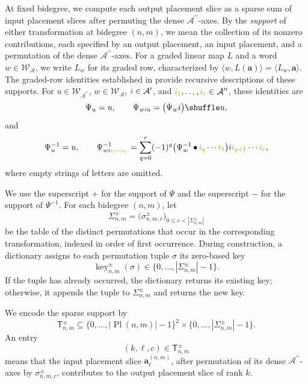 \documentclass{amsart}
\theoremstyle{definition}
\theoremstyle{remark}
\newcommand{\gammashuffle}{{\,\bullet\,}}
\newcommand{\blue}[1]{{\color{blue}#1}}
\newcommand{\orange}[1]{{\color{orange}#1}}
\begin{document}
At fixed bidegree, we compute each output placement slice as a sparse sum
of input placement slices after permuting the dense
$\mathcal{A}^{\prime\prime}$-axes. By the \emph{support} of either
transformation at bidegree $(n,m)$, we mean the collection of its nonzero
contributions, each specified by an output placement, an input placement,
and a permutation of the dense
$\mathcal{A}^{\prime\prime}$-axes. For a graded linear map $L$ and a word
$w\in\mathcal{W}_{\mathcal{A}}$, we write $L_w$ for its graded row,
characterized by
$\langle w,L(\mathbf{a})\rangle=\langle L_w,\mathbf{a}\rangle$.
The graded-row identities established in
\cite[Propositions~3.2 and~3.7]{mainpaper} provide recursive descriptions
of these supports. For
$u\in\mathcal{W}_{\mathcal{A}^{\prime\prime}}$,
$w\in\mathcal{W}_{\mathcal{A}}$,
$\blue{i}\in\mathcal{A}^{\prime}$, and
$\orange{i_1},\ldots,\orange{i_r}
\in\mathcal{A}^{\prime\prime}$, these identities are
\begin{equation}
\label{eq:psi_row_recursion}
    \Psi_u
    =
    u,
    \qquad
    \Psi_{w\blue{i}u}
    =
    \bigl(
        \Psi_w\blue{i}
    \bigr)
    \shuffle u,
\end{equation}
and
\begin{equation}
\label{eq:psi_inverse_row_recursion}
    \Psi^{-1}_u
    =
    u,
    \qquad
    \Psi^{-1}_{w\blue{i}\orange{i_1}\cdots\orange{i_r}}
    =
    \sum_{q=0}^{r}
    (-1)^q
    \bigl(
        \Psi^{-1}_w
        \gammashuffle
        \orange{i_q}\cdots\orange{i_1}
    \bigr)
    \blue{i}
    \orange{i_{q+1}}\cdots\orange{i_r},
\end{equation}
where empty strings of letters are omitted.

We use the superscript $+$ for the support of $\Psi$ and the superscript
$-$ for the support of $\Psi^{-1}$. For each bidegree $(n,m)$, let
\[
    \Sigma^{\pm}_{n,m}
    =
    \bigl(
        \sigma^{\pm}_{n,m,c}
    \bigr)_{0\leq c<|\Sigma^{\pm}_{n,m}|}
\]
be the table of the distinct permutations that occur in the corresponding
transformation, indexed in order of first occurrence. During construction,
a dictionary assigns to each permutation tuple $\sigma$ its zero-based key
\[
    \operatorname{key}^{\pm}_{n,m}(\sigma)
    \in
    \{0,\ldots,|\Sigma^{\pm}_{n,m}|-1\}.
\]
If the tuple has already occurred, the dictionary returns its existing key;
otherwise, it appends the tuple to $\Sigma^{\pm}_{n,m}$ and returns the new
key.

We encode the sparse support by
\[
    \mathsf{T}^{\pm}_{n,m}
    \subseteq
    \{0,\ldots,|\operatorname{Pl}(n,m)|-1\}^{2}
    \times
    \{0,\ldots,|\Sigma^{\pm}_{n,m}|-1\}.
\]
An entry
\[
    (k,\ell,c)
    \in
    \mathsf{T}^{\pm}_{n,m}
\]
means that the input placement slice
$\mathbf{a}^{(n,m)}_\ell$, after permutation of its dense
$\mathcal{A}^{\prime\prime}$-axes by
$\sigma^{\pm}_{n,m,c}$, contributes to the output placement slice of rank
$k$.
\end{document}
